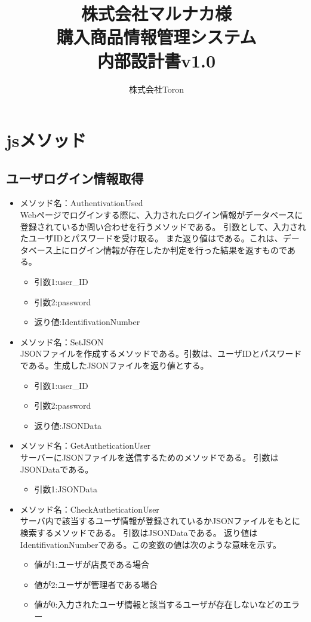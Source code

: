 \documentclass[a4j]{jarticle}
\title{
\vspace{30mm}
株式会社マルナカ様\\
購入商品情報管理システム\\
内部設計書v1.0
\vspace{90mm}
}
\author{
株式会社Toron
}
\begin{document}
\maketitle
\newpage
\tableofcontents
\newpage
\section{jsメソッド}
\subsection{ユーザログイン情報取得}
\begin{itemize}
\item メソッド名：AuthentivationUsed\\
Webページでログインする際に、入力されたログイン情報がデータベースに登録されているか問い合わせを行うメソッドである。
引数として、入力されたユーザIDとパスワードを受け取る。
また返り値はである。これは、データベース上にログイン情報が存在したか判定を行った結果を返すものである。

	\begin{itemize}
		\item 引数1:user\_ID
		\item 引数2:password
		\item 返り値:IdentifivationNumber
	\end{itemize}
\item メソッド名：SetJSON\\

JSONファイルを作成するメソッドである。引数は、ユーザIDとパスワードである。生成したJSONファイルを返り値とする。
	\begin{itemize}
		\item 引数1:user\_ID
		\item 引数2:password
		\item 返り値:JSONData
	\end{itemize}
\item メソッド名：GetAutheticationUser\\

サーバーにJSONファイルを送信するためのメソッドである。
引数はJSONDataである。
	\begin{itemize}
		\item 引数1:JSONData
	\end{itemize}
	
\item メソッド名：CheckAutheticationUser\\

サーバ内で該当するユーザ情報が登録されているかJSONファイルをもとに検索するメソッドである。
引数はJSONDataである。
返り値はIdentifivationNumberである。この変数の値は次のような意味を示す。
	\begin{itemize}
		\item 値が1:ユーザが店長である場合
		\item 値が2:ユーザが管理者である場合
		\item 値が0:入力されたユーザ情報と該当するユーザが存在しないなどのエラー
	\end{itemize}



\end{itemize}
\end{document}
